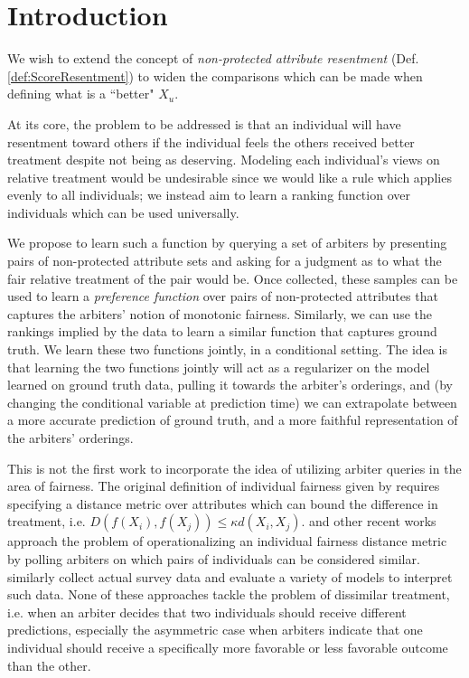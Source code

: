 \section{Introduction}\label{sec:softmono_bg}
    
    We wish to extend the concept of \emph{non-protected attribute resentment} (Def. \ref{def:ScoreResentment}) to widen the comparisons which can be made when defining what is a ``better" $X_u$.
    
    At its core, the problem to be addressed is that an individual will have resentment toward others if the individual feels the others received better treatment despite not being as deserving.  Modeling each individual's views on relative treatment would be undesirable since we would like a rule which applies evenly to all individuals; we instead aim to learn a ranking function over individuals which can be used universally.  
    
    We propose to learn such a function by querying a set of arbiters by presenting pairs of non-protected attribute sets and asking for a judgment as to what the fair relative treatment of the pair would be. Once collected, these samples can be used to learn a \emph{preference function} over pairs of non-protected attributes that captures the arbiters' notion of monotonic fairness. Similarly, we can use the rankings implied by the data to learn a similar function that captures ground truth. We learn these two functions jointly, in a conditional setting. The idea is that learning the two functions jointly will act as a regularizer on the model learned on ground truth data, pulling it towards the arbiter's orderings, and (by changing the conditional variable at prediction time) we can extrapolate between a more accurate prediction of ground truth, and a more faithful representation of the arbiters' orderings.

    This is not the first work to incorporate the idea of utilizing arbiter queries in the area of fairness.  The original definition of individual fairness given by  \citet{dwork2012fairness} requires specifying a distance metric over attributes which can bound the difference in treatment, i.e. $D\left(f(X_i), f(X_j)\right) \le \kappa d(X_i, X_j)$. \citet{ilvento2019metric} and other recent works \citep{jung2019eliciting,lahoti2019operationalizing,wang2019empirical} approach the problem of operationalizing an individual fairness distance metric by polling arbiters on which pairs of individuals can be considered similar.  \citet{wang2019empirical} similarly collect actual survey data and evaluate a variety of models to interpret such data.  None of these approaches tackle the problem of dissimilar treatment, i.e. when an arbiter decides that two individuals should receive different predictions, especially the asymmetric case when arbiters indicate that one individual should receive a specifically more favorable or less favorable outcome than the other.
    
